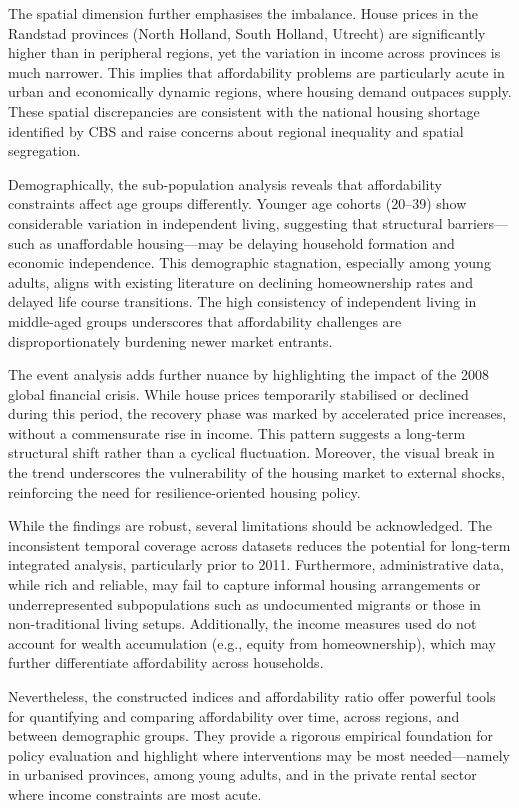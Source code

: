 \documentclass[
]{article}
\begin{document}
The spatial dimension further emphasises the imbalance. House prices in
the Randstad provinces (North Holland, South Holland, Utrecht) are
significantly higher than in peripheral regions, yet the variation in
income across provinces is much narrower. This implies that
affordability problems are particularly acute in urban and economically
dynamic regions, where housing demand outpaces supply. These spatial
discrepancies are consistent with the national housing shortage
identified by CBS and raise concerns about regional inequality and
spatial segregation.

Demographically, the sub-population analysis reveals that affordability
constraints affect age groups differently. Younger age cohorts (20--39)
show considerable variation in independent living, suggesting that
structural barriers---such as unaffordable housing---may be delaying
household formation and economic independence. This demographic
stagnation, especially among young adults, aligns with existing
literature on declining homeownership rates and delayed life course
transitions. The high consistency of independent living in middle-aged
groups underscores that affordability challenges are disproportionately
burdening newer market entrants.

The event analysis adds further nuance by highlighting the impact of the
2008 global financial crisis. While house prices temporarily stabilised
or declined during this period, the recovery phase was marked by
accelerated price increases, without a commensurate rise in income. This
pattern suggests a long-term structural shift rather than a cyclical
fluctuation. Moreover, the visual break in the trend underscores the
vulnerability of the housing market to external shocks, reinforcing the
need for resilience-oriented housing policy.

While the findings are robust, several limitations should be
acknowledged. The inconsistent temporal coverage across datasets reduces
the potential for long-term integrated analysis, particularly prior to
2011. Furthermore, administrative data, while rich and reliable, may
fail to capture informal housing arrangements or underrepresented
subpopulations such as undocumented migrants or those in non-traditional
living setups. Additionally, the income measures used do not account for
wealth accumulation (e.g., equity from homeownership), which may further
differentiate affordability across households.

Nevertheless, the constructed indices and affordability ratio offer
powerful tools for quantifying and comparing affordability over time,
across regions, and between demographic groups. They provide a rigorous
empirical foundation for policy evaluation and highlight where
interventions may be most needed---namely in urbanised provinces, among
young adults, and in the private rental sector where income constraints
are most acute.
\end{document}
